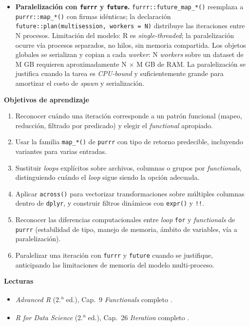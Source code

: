\documentclass[11pt,letterpaper]{article}
\begin{document}
\begin{itemize}[leftmargin=*, itemsep=2pt]
    \item \textbf{Paralelización con \texttt{furrr} y \texttt{future}.} \texttt{furrr::future\_map\_*()} reemplaza a \texttt{purrr::map\_*()} con firmas idénticas; la declaración \texttt{future::plan(multisession, workers = N)} distribuye las iteraciones entre N procesos. Limitación del modelo: R es \textit{single-threaded}; la paralelización ocurre vía procesos separados, no hilos, sin memoria compartida. Los objetos globales se serializan y copian a cada \textit{worker}: N \textit{workers} sobre un dataset de M GB requieren aproximadamente N $\times$ M GB de RAM. La paralelización se justifica cuando la tarea es \textit{CPU-bound} y suficientemente grande para amortizar el costo de \textit{spawn} y serialización.
\end{itemize}

\medskip
\noindent\textbf{Objetivos de aprendizaje}
\begin{enumerate}[leftmargin=*, itemsep=1pt]
    \item Reconocer cuándo una iteración corresponde a un patrón funcional (mapeo, reducción, filtrado por predicado) y elegir el \textit{functional} apropiado.
    \item Usar la familia \texttt{map\_*()} de \texttt{purrr} con tipo de retorno predecible, incluyendo variantes para varias entradas.
    \item Sustituir \textit{loops} explícitos sobre archivos, columnas o grupos por \textit{functionals}, distinguiendo cuándo el \textit{loop} sigue siendo la opción adecuada.
    \item Aplicar \texttt{across()} para vectorizar transformaciones sobre múltiples columnas dentro de \texttt{dplyr}, y construir filtros dinámicos con \texttt{expr()} y \texttt{!!}.
    \item Reconocer las diferencias computacionales entre \textit{loop} \texttt{for} y \textit{functionals} de \texttt{purrr} (estabilidad de tipo, manejo de memoria, ámbito de variables, vía a paralelización).
    \item Paralelizar una iteración con \texttt{furrr} y \texttt{future} cuando se justifique, anticipando las limitaciones de memoria del modelo multi-proceso.
\end{enumerate}

\medskip
\noindent\textbf{Lecturas}
\begin{itemize}[leftmargin=*, itemsep=1pt]
    \item \textit{Advanced R} (2.\textsuperscript{a} ed.), Cap.\ 9 \textit{Functionals} completo \cite{wickham2019advr}.
    \item \textit{R for Data Science} (2.\textsuperscript{a} ed.), Cap.\ 26 \textit{Iteration} completo \cite{wickham2023r4ds}.
\end{itemize}
\end{document}
